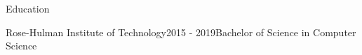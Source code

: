 \documentclass{resume} %
\begin{document}
\begin{rSection}{Education}
\begin{rsemisection}{Rose-Hulman Institute of Technology}{2015 - 2019}{Bachelor of Science in Computer Science}
\end{rsemisection}
\end{rSection}


\end{document}
